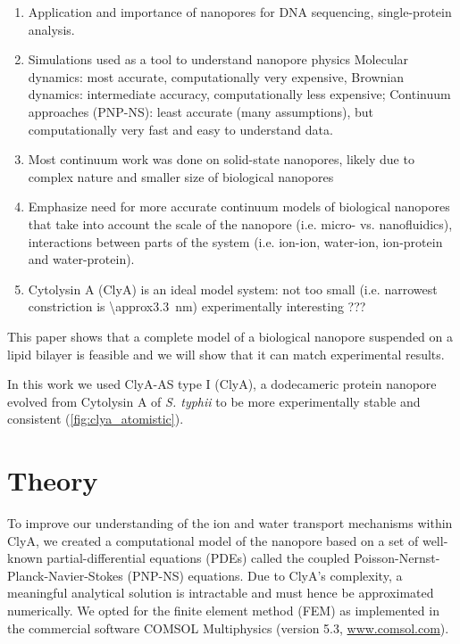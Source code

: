 \documentclass[journal=ancac3, manuscript=article, etalmode=truncate,maxauthors=0]{achemso}
\begin{document}
\begin{enumerate}
	\item Application and importance of nanopores for DNA sequencing, single-protein analysis.
	\item Simulations used as a tool to understand nanopore physics
	\subitem Molecular dynamics: most accurate, computationally very expensive,
	\subitem Brownian dynamics: intermediate accuracy, computationally less expensive;
	\subitem Continuum approaches (PNP-NS): least accurate (many assumptions), but computationally very fast and easy to understand data.
	\item Most continuum work was done on solid-state nanopores, likely due to complex nature and smaller size of biological nanopores
	\item Emphasize need for more accurate continuum models of biological nanopores that take into account
	\subitem the scale of the nanopore (i.e. micro- vs. nanofluidics),
	\subitem interactions between parts of the system (i.e. ion-ion, water-ion, ion-protein and water-protein).
	\item Cytolysin A (ClyA) is an ideal model system:
	\subitem not too small (i.e. narrowest constriction is \SI{\approx3.3}{\nano\meter})
	\subitem experimentally interesting
	\subitem ???
\end{enumerate}

This paper shows that a complete model of a biological nanopore suspended on a lipid bilayer is feasible and we will show that it can match experimental results.

In this work we used ClyA-AS type I (ClyA), a dodecameric protein nanopore evolved from Cytolysin A of \textit{S. typhii} to be more experimentally stable and consistent (\cref{fig:clya_atomistic}).\cite{soskine2013}




\section{Theory}
To improve our understanding of the ion and water transport mechanisms within ClyA,
we created a computational model of the nanopore based on a set of well-known partial-differential equations (PDEs) called the coupled Poisson-Nernst-Planck-Navier-Stokes (PNP-NS) equations.
Due to ClyA's complexity, a meaningful analytical solution is intractable and must hence be approximated numerically.
We opted for the finite element method (FEM) as implemented in the commercial software COMSOL Multiphysics (version 5.3, \href{www.comsol.com}{www.comsol.com}).
\end{document}
